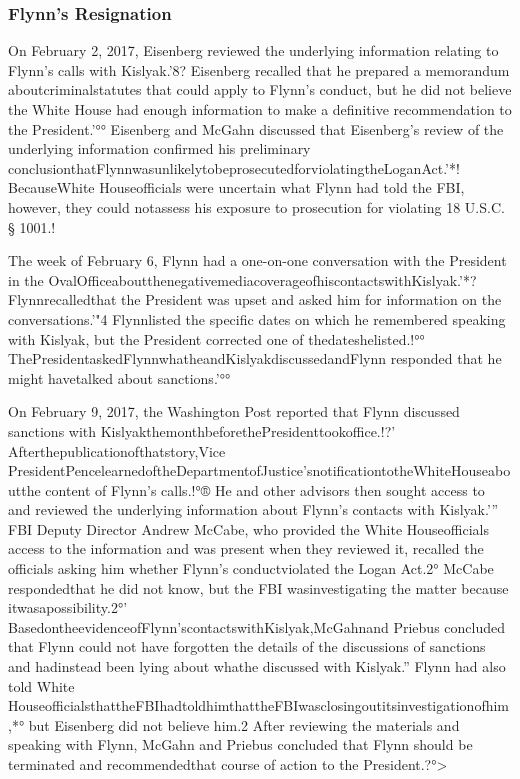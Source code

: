 \subsubsection{Flynn's Resignation}

On February 2, 2017, Eisenberg reviewed the underlying information relating to Flynn’s calls with Kislyak.'8?
Eisenberg recalled that he prepared a memorandum aboutcriminalstatutes that could apply to Flynn’s conduct, but he did not believe the White House had enough information to make a definitive recommendation to the President.'°°
Eisenberg and McGahn discussed that Eisenberg’s review of the underlying information confirmed his preliminary conclusionthatFlynnwasunlikelytobeprosecutedforviolatingtheLoganAct.'*!
BecauseWhite Houseofficials were uncertain what Flynn had told the FBI, however, they could notassess his exposure to prosecution for violating 18 U.S.C. § 1001.!%

The week of February 6, Flynn had a one-on-one conversation with the President in the OvalOfficeaboutthenegativemediacoverageofhiscontactswithKislyak.'*?
Flynnrecalledthat the President was upset and asked him for information on the conversations.'"4
Flynnlisted the specific dates on which he remembered speaking with Kislyak, but the President corrected one of thedateshelisted.!°°
ThePresidentaskedFlynnwhatheandKislyakdiscussedandFlynn responded that he might havetalked about sanctions.'°°

On February 9, 2017, the Washington Post reported that Flynn discussed sanctions with KislyakthemonthbeforethePresidenttookoffice.!?’
Afterthepublicationofthatstory,Vice PresidentPencelearnedoftheDepartmentofJustice’snotificationtotheWhiteHouseaboutthe content of Flynn’s calls.!°®
He and other advisors then sought access to and reviewed the underlying information about Flynn’s contacts with Kislyak.'”
FBI Deputy Director Andrew McCabe, who provided the White Houseofficials access to the information and was present when they reviewed it, recalled the officials asking him whether Flynn’s conductviolated the Logan Act.2°
McCabe respondedthat he did not know, but the FBI wasinvestigating the matter because itwasapossibility.2°'
BasedontheevidenceofFlynn’scontactswithKislyak,McGahnand Priebus concluded that Flynn could not have forgotten the details of the discussions of sanctions and hadinstead been lying about whathe discussed with Kislyak.”
Flynn had also told White HouseofficialsthattheFBIhadtoldhimthattheFBIwasclosingoutitsinvestigationofhim,*°
but Eisenberg did not believe him.2
After reviewing the materials and speaking with Flynn, McGahn and Priebus concluded that Flynn should be terminated and recommendedthat course of action to the President.?°>

